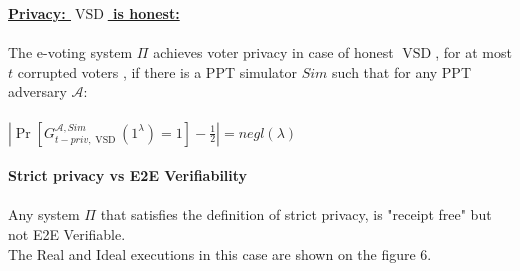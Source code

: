 \documentclass[12pt]{article}
\DeclareMathOperator{\vsd}{VSD}
\begin{document}
\underline{\textbf{Privacy: $\vsd$ is honest:}}\\\\
The e-voting system $\Pi$ achieves voter privacy in case of honest $\vsd$, for at most $t$ corrupted voters , if there is a PPT simulator $Sim$ such that for any PPT adversary $\mathcal{A}$:\\\\
 $|\Pr[G_{t-priv,\vsd}^{\mathcal{A},Sim}(1^{\lambda}) = 1] - \frac{1}{2}| = negl(\lambda)$\\\\
 \newpage 
{\textbf{\huge{Strict privacy vs E2E Verifiability}}}\\\\
Any system $\Pi$ that satisfies the definition of strict privacy, is "receipt free" but not E2E Verifiable.\\
The Real and Ideal executions in this case are shown on the figure 6.
\end{document}
